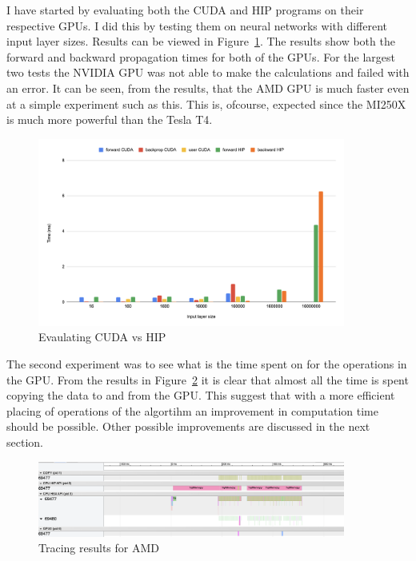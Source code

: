 \documentclass[a4paper,11pt]{scrartcl}
\begin{document}
I have started by evaluating both the CUDA and HIP programs on their respective GPUs. I did this by testing them on neural networks with different input layer sizes. Results can be viewed in Figure~\ref{fig:vs}. The results show both the forward and backward propagation times for both of the GPUs. For the largest two tests the NVIDIA GPU was not able to make the calculations and failed with an error. It can be seen, from the results, that the AMD GPU is much faster even at a simple experiment such as this. This is, ofcourse, expected since the MI250X is much more powerful than the Tesla T4. 

\begin{figure}[h]
  \centering
  \includegraphics*[width=0.9\textwidth]{images/chart2.png}
  \caption{Evaulating CUDA vs HIP}
  \label{fig:vs}
\end{figure}

The second experiment was to see what is the time spent on for the operations in the GPU. From the results in Figure~\ref{fig:trace} it is clear that almost all the time is spent copying the data to and from the GPU. This suggest that with a more efficient placing of operations of the algortihm an improvement in computation time should be possible. Other possible improvements are discussed in the next section.

\begin{figure}[h]
  \centering
  \includegraphics*[width=0.9\textwidth]{images/tracing.png}
  \caption{Tracing results for AMD}
  \label{fig:trace}
\end{figure}
\end{document}
